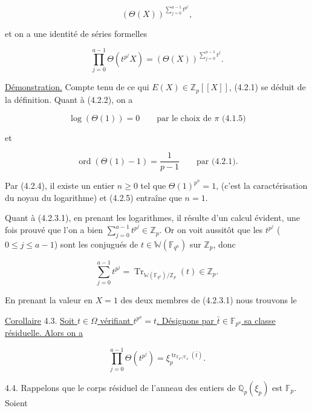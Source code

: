
\[
(\Theta(X))^{\sum_{j=0}^{a-1}t^{p^j}},
\]

et on a une identité de séries formelles

\begin{equation}\tag{4.2.3.1}
\prod_{j=0}^{a-1}\Theta(t^{p^j}X)
=(\Theta(X))^{\sum_{j=0}^{a-1}t^j}.
\end{equation}

\underline{Démonstration.} Compte tenu de ce qui
$E(X)\in\mathbb Z_p[[X]]$, (4.2.1) se déduit de la définition. Quant à
(4.2.2), on a

\begin{equation}\tag{4.2.4}
\log(\Theta(1))=0
\qquad\text{par le choix de $\pi$ (4.1.5)}
\end{equation}

et

\begin{equation}\tag{4.2.5}
\operatorname{ord}(\Theta(1)-1)=\frac1{p-1}
\qquad\text{par (4.2.1).}
\end{equation}

Par (4.2.4), il existe un entier $n\geq0$ tel que
$\Theta(1)^{p^n}=1$, (c'est la caractérisation du noyau du logarithme) et
(4.2.5) entraîne que $n=1$.

Quant à (4.2.3.1), en prenant les logarithmes, il résulte d'un calcul évident,
une fois prouvé que l'on a bien
$\sum_{j=0}^{a-1}t^{p^j}\in\mathbb Z_p$. Or on voit aussitôt que les
$t^{p^j}$ ($0\leq j\leq a-1$) sont les conjugués de
$t\in\mathbb W(\mathbb F_{q^a})$ sur $\mathbb Z_p$, donc

\[
\sum_{j=0}^{a-1}t^{p^j}
=\operatorname{Tr}_{\mathbb W(\mathbb F_{q^a})/\mathbb Z_p}(t)\in\mathbb Z_p.
\]

En prenant la valeur en $X=1$ des deux membres de (4.2.3.1) nous trouvons le

\underline{Corollaire} 4.3. \underline{Soit $t\in\Omega$ vérifiant $t^{p^a}=t$.
Désignons par $\bar t\in\mathbb F_{p^a}$ sa classe résiduelle. Alors on a}

\begin{equation}\tag{4.3.1}
\prod_{j=0}^{a-1}\Theta(t^{p^j})
=\xi_p^{\operatorname{tr}_{\mathbb F_{p^a}/\mathbb F_p}(\bar t)}.
\end{equation}


4.4. Rappelons que le corps résiduel de l'anneau des entiers de
$\mathbb Q_p(\xi_p)$ est $\mathbb F_p$. Soient

